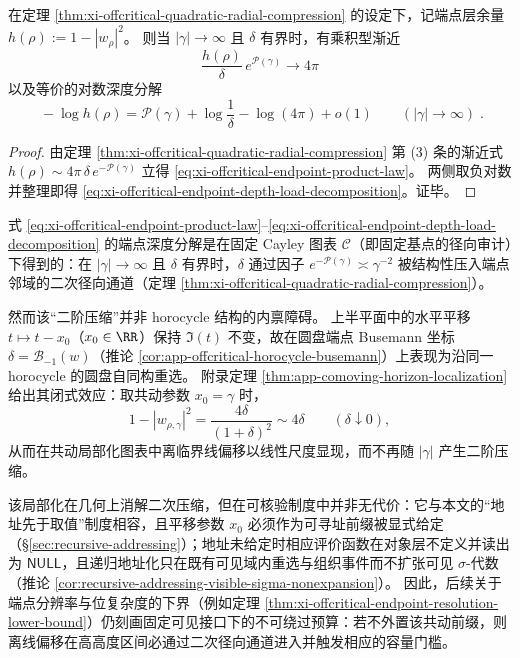 \begin{corollary}\label{cor:xi-offcritical-endpoint-depth-log-decomposition}
在定理 \ref{thm:xi-offcritical-quadratic-radial-compression} 的设定下，记端点层余量
\(
h(\rho):=1-|w_\rho|^2
\)。
则当 \(|\gamma|\to\infty\) 且 \(\delta\) 有界时，有乘积型渐近
\begin{equation}\label{eq:xi-offcritical-endpoint-product-law}
\boxed{\;
\frac{h(\rho)}{\delta}\,e^{\mathcal{P}(\gamma)}\to 4\pi\;}
\end{equation}
以及等价的对数深度分解
\begin{equation}\label{eq:xi-offcritical-endpoint-depth-load-decomposition}
\boxed{\;
-\log h(\rho)=\mathcal{P}(\gamma)+\log\frac{1}{\delta}-\log(4\pi)+o(1)\qquad(|\gamma|\to\infty)\; }.
\end{equation}
\end{corollary}

\begin{proof}
由定理 \ref{thm:xi-offcritical-quadratic-radial-compression} 第 (3) 条的渐近式
\(
h(\rho)\sim 4\pi\,\delta\,e^{-\mathcal{P}(\gamma)}
\)
立得 \eqref{eq:xi-offcritical-endpoint-product-law}。
两侧取负对数并整理即得 \eqref{eq:xi-offcritical-endpoint-depth-load-decomposition}。证毕。
\end{proof}

\begin{remark}\label{rem:xi-comoving-horizon-localization-address-null}
式 \eqref{eq:xi-offcritical-endpoint-product-law}--\eqref{eq:xi-offcritical-endpoint-depth-load-decomposition} 的端点深度分解是在固定 Cayley 图表 \(\mathcal{C}\)（即固定基点的径向审计）下得到的：在 \(|\gamma|\to\infty\) 且 \(\delta\) 有界时，\(\delta\) 通过因子 \(e^{-\mathcal{P}(\gamma)}\asymp \gamma^{-2}\) 被结构性压入端点邻域的二次径向通道（定理 \ref{thm:xi-offcritical-quadratic-radial-compression}）。
\par
然而该“二阶压缩”并非 horocycle 结构的内禀障碍。
上半平面中的水平平移 \(t\mapsto t-x_0\)（\(x_0\in\RR\)）保持 \(\Im(t)\) 不变，故在圆盘端点 Busemann 坐标 \(\delta=\mathcal{B}_{-1}(w)\)（推论 \ref{cor:app-offcritical-horocycle-busemann}）上表现为沿同一 horocycle 的圆盘自同构重选。
附录定理 \ref{thm:app-comoving-horizon-localization} 给出其闭式效应：取共动参数 \(x_0=\gamma\) 时，
\[
1-|w_{\rho,\gamma}|^2=\frac{4\delta}{(1+\delta)^2}\sim 4\delta\qquad(\delta\downarrow 0),
\]
从而在共动局部化图表中离临界线偏移以线性尺度显现，而不再随 \(|\gamma|\) 产生二阶压缩。
\par
该局部化在几何上消解二次压缩，但在可核验制度中并非无代价：它与本文的“地址先于取值”制度相容，且平移参数 \(x_0\) 必须作为可寻址前缀被显式给定（\S\ref{sec:recursive-addressing}）；地址未给定时相应评价函数在对象层不定义并读出为 \(\mathsf{NULL}\)，且递归地址化只在既有可见域内重选与组织事件而不扩张可见 \(\sigma\)-代数（推论 \ref{cor:recursive-addressing-visible-sigma-nonexpansion}）。
因此，后续关于端点分辨率与位复杂度的下界（例如定理 \ref{thm:xi-offcritical-endpoint-resolution-lower-bound}）仍刻画固定可见接口下的不可绕过预算：若不外置该共动前缀，则离线偏移在高高度区间必通过二次径向通道进入并触发相应的容量门槛。
\end{remark}


